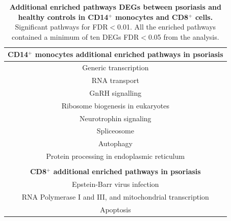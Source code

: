 \begin{table}[htbp]
\centering
\begin{tabular}{@{} c }
\toprule
\textbf{CD14$^+$ monocytes additional enriched pathways in psoriasis} \\
\midrule
\midrule
Generic transcription \\
RNA transport \\
GnRH signalling \\
Ribosome biogenesis in eukaryotes \\
Neurotrophin signaling \\
Spliceosome \\
Autophagy \\
Protein processing in endoplasmic reticulum \\
                        \\
\textbf{CD8$^+$ additional enriched pathways in psoriasis} \\
\midrule
\midrule
Epstein-Barr virus infection \\
RNA Polymerase I and III, and mitochondrial transcription\\
Apoptosis \\
\bottomrule
\end{tabular}
\medskip %
\caption[Additional enriched pathways for DEGs between psoriasis and healthy controls in CD14$^+$ monocytes and CD8$^+$ cells.]{\textbf{Additional enriched pathways DEGs between psoriasis and healthy controls in CD14$^+$ monocytes and CD8$^+$ cells.} Significant pathways for FDR$<$0.01. All the enriched pathways contained a minimum of ten DEGs FDR$<$0.05 from the analysis.}
\label{tab:RNAseq_PS_CTL_additional_pathways}
\end{table}



